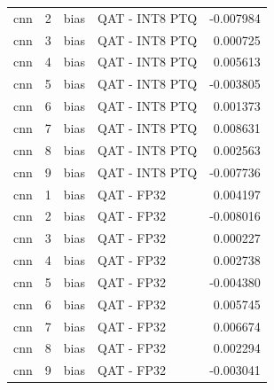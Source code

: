 \begin{tabular}{lrllr}
cnn & 2 & bias & QAT - INT8 PTQ & -0.007984 \\
cnn & 3 & bias & QAT - INT8 PTQ & 0.000725 \\
cnn & 4 & bias & QAT - INT8 PTQ & 0.005613 \\
cnn & 5 & bias & QAT - INT8 PTQ & -0.003805 \\
cnn & 6 & bias & QAT - INT8 PTQ & 0.001373 \\
cnn & 7 & bias & QAT - INT8 PTQ & 0.008631 \\
cnn & 8 & bias & QAT - INT8 PTQ & 0.002563 \\
cnn & 9 & bias & QAT - INT8 PTQ & -0.007736 \\
cnn & 1 & bias & QAT - FP32 & 0.004197 \\
cnn & 2 & bias & QAT - FP32 & -0.008016 \\
cnn & 3 & bias & QAT - FP32 & 0.000227 \\
cnn & 4 & bias & QAT - FP32 & 0.002738 \\
cnn & 5 & bias & QAT - FP32 & -0.004380 \\
cnn & 6 & bias & QAT - FP32 & 0.005745 \\
cnn & 7 & bias & QAT - FP32 & 0.006674 \\
cnn & 8 & bias & QAT - FP32 & 0.002294 \\
cnn & 9 & bias & QAT - FP32 & -0.003041 \\
\bottomrule
\end{tabular}
